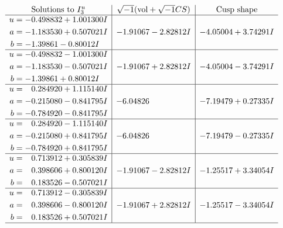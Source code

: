 \documentclass[1p]{elsarticle_modified}
\theoremstyle{definition}
\newcommand{\I}{\sqrt{-1}}
\begin{document}
$$\begin{array}{c|c|c}  
\text{Solutions to }I^u_{3}& \I (\text{vol} + \sqrt{-1}CS) & \text{Cusp shape}\\
 \hline 
\begin{aligned}
u &= -0.498832 + 1.001300 I \\
a &= -1.183530 + 0.507021 I \\
b &= -1.39861 - 0.80012 I\end{aligned}
 & -1.91067 - 2.82812 I & -4.05004 + 3.74291 I \\ \hline\begin{aligned}
u &= -0.498832 - 1.001300 I \\
a &= -1.183530 - 0.507021 I \\
b &= -1.39861 + 0.80012 I\end{aligned}
 & -1.91067 + 2.82812 I & -4.05004 - 3.74291 I \\ \hline\begin{aligned}
u &= \phantom{-}0.284920 + 1.115140 I \\
a &= -0.215080 - 0.841795 I \\
b &= -0.784920 - 0.841795 I\end{aligned}
 & -6.04826\phantom{ +0.000000I} & -7.19479 + 0.27335 I \\ \hline\begin{aligned}
u &= \phantom{-}0.284920 - 1.115140 I \\
a &= -0.215080 + 0.841795 I \\
b &= -0.784920 + 0.841795 I\end{aligned}
 & -6.04826\phantom{ +0.000000I} & -7.19479 - 0.27335 I \\ \hline\begin{aligned}
u &= \phantom{-}0.713912 + 0.305839 I \\
a &= \phantom{-}0.398606 + 0.800120 I \\
b &= \phantom{-}0.183526 - 0.507021 I\end{aligned}
 & -1.91067 - 2.82812 I & -1.25517 + 3.34054 I \\ \hline\begin{aligned}
u &= \phantom{-}0.713912 - 0.305839 I \\
a &= \phantom{-}0.398606 - 0.800120 I \\
b &= \phantom{-}0.183526 + 0.507021 I\end{aligned}
 & -1.91067 + 2.82812 I & -1.25517 - 3.34054 I\\
 \hline 
 \end{array}$$\newpage
\end{document}
